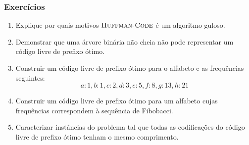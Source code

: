 \documentclass{beamer}
\begin{document}

\begin{frame}
\frametitle{Exercícios}

\begin{enumerate}
\item Explique por quais motivos $\textnormal{\scshape Huffman-Code}$ é um algoritmo guloso.
\item Demonstrar que uma árvore binária não cheia não pode representar um código livre de prefixo ótimo.
\item Construir um código livre de prefixo ótimo para o alfabeto e as frequências seguintes:
$$
a: 1, b: 1, c: 2, d: 3, e: 5, f: 8, g: 13, h: 21
$$
\item Construir um código livre de prefixo ótimo para um alfabeto cujas
  frequências correspondem à sequência de Fibobacci.
\item Caracterizar instâncias do problema tal que todas as codificações do
  código livre de prefixo ótimo tenham o mesmo comprimento.
\end{enumerate}

\end{frame}
\end{document}
